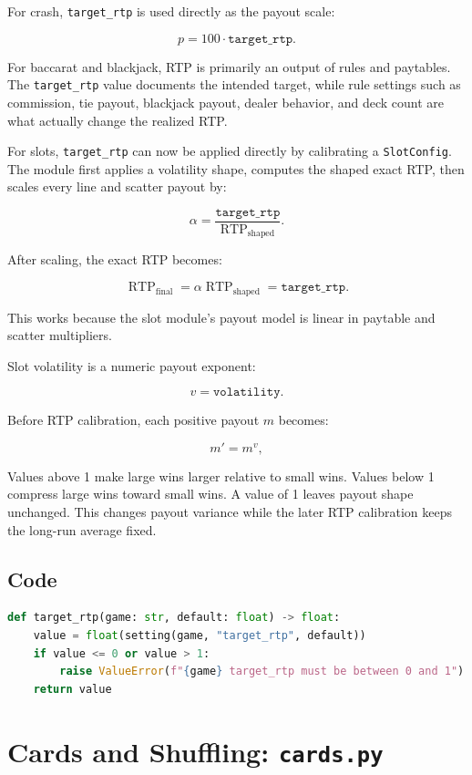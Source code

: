 \documentclass[11pt]{article}
\begin{document}
For crash, \texttt{target\_rtp} is used directly as the payout scale:

\[
p = 100 \cdot \texttt{target\_rtp}.
\]

For baccarat and blackjack, RTP is primarily an output of rules and paytables. The \texttt{target\_rtp} value documents the intended target, while rule settings such as commission, tie payout, blackjack payout, dealer behavior, and deck count are what actually change the realized RTP.

For slots, \texttt{target\_rtp} can now be applied directly by calibrating a \texttt{SlotConfig}. The module first applies a volatility shape, computes the shaped exact RTP, then scales every line and scatter payout by:

\[
\alpha = \frac{\texttt{target\_rtp}}{\operatorname{RTP}_{\text{shaped}}}.
\]

After scaling, the exact RTP becomes:

\[
\operatorname{RTP}_{\text{final}}
=
\alpha \operatorname{RTP}_{\text{shaped}}
=
\texttt{target\_rtp}.
\]

This works because the slot module's payout model is linear in paytable and scatter multipliers.

Slot volatility is a numeric payout exponent:

\[
v = \texttt{volatility}.
\]

Before RTP calibration, each positive payout \(m\) becomes:

\[
m' = m^v,
\]

Values above 1 make large wins larger relative to small wins. Values below 1 compress large wins toward small wins. A value of 1 leaves payout shape unchanged. This changes payout variance while the later RTP calibration keeps the long-run average fixed.

\subsection{Code}

\begin{lstlisting}[language=Python]
def target_rtp(game: str, default: float) -> float:
    value = float(setting(game, "target_rtp", default))
    if value <= 0 or value > 1:
        raise ValueError(f"{game} target_rtp must be between 0 and 1")
    return value
\end{lstlisting}

\section{Cards and Shuffling: \texttt{cards.py}}
\end{document}
